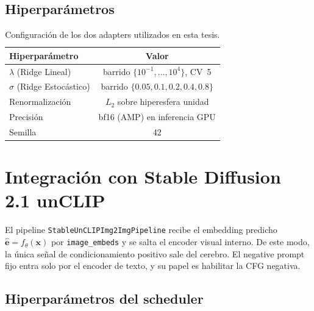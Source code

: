 \subsection{Hiperparámetros}

\begin{table}[H]
\centering
\begin{tabular}{| l | c |}
\hline
\textbf{Hiperparámetro} & \textbf{Valor} \\ \hline
$\lambda$ (Ridge Lineal) & barrido $\{10^{-1},\dots,10^{4}\}$, CV~5 \\ \hline
$\sigma$ (Ridge Estocástico) & barrido $\{0.05,0.1,0.2,0.4,0.8\}$ \\ \hline
Renormalización & $L_{2}$ sobre hiperesfera unidad \\ \hline
Precisión & bf16 (AMP) en inferencia GPU \\ \hline
Semilla & 42 \\ \hline
\end{tabular}
\caption[Hiperparámetros de los adapters]{Configuración de los dos adapters utilizados en esta tesis.}
\label{table:adapters_hparams}
\end{table}

\section{Integración con Stable Diffusion 2.1 unCLIP}

El pipeline \texttt{StableUnCLIPImg2ImgPipeline} recibe el embedding predicho $\hat{\mathbf{e}}=f_{\theta}(\mathbf{x})$ por \texttt{image\_embeds} y se salta el encoder visual interno. De este modo, la única señal de condicionamiento positivo sale del cerebro. El negative prompt fijo entra solo por el encoder de texto, y su papel es habilitar la CFG negativa.

\subsection{Hiperparámetros del scheduler}


